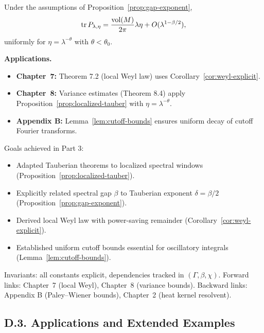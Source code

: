 \begin{corollary}\label{cor:weyl-explicit}
Under the assumptions of Proposition~\ref{prop:gap-exponent},
\[
\operatorname{tr} P_{\lambda,\eta} = \frac{\operatorname{vol}(M)}{2\pi}\lambda \eta + O(\lambda^{1-\beta/2}),
\]
uniformly for $\eta=\lambda^{-\theta}$ with $\theta<\theta_0$.  
\end{corollary}

\medskip

\noindent \textbf{Applications.}  
\begin{itemize}
  \item \textbf{Chapter~7:} Theorem 7.2 (local Weyl law) uses Corollary~\ref{cor:weyl-explicit}.  
  \item \textbf{Chapter~8:} Variance estimates (Theorem 8.4) apply Proposition~\ref{prop:localized-tauber} with $\eta=\lambda^{-\theta}$.  
  \item \textbf{Appendix B:} Lemma~\ref{lem:cutoff-bounds} ensures uniform decay of cutoff Fourier transforms.  
\end{itemize}

\medskip

\begin{auditblock}[D3]
Goals achieved in Part 3:
\begin{itemize}
  \item Adapted Tauberian theorems to localized spectral windows (Proposition~\ref{prop:localized-tauber}).  
  \item Explicitly related spectral gap $\beta$ to Tauberian exponent $\delta=\beta/2$ (Proposition~\ref{prop:gap-exponent}).  
  \item Derived local Weyl law with power-saving remainder (Corollary~\ref{cor:weyl-explicit}).  
  \item Established uniform cutoff bounds essential for oscillatory integrals (Lemma~\ref{lem:cutoff-bounds}).  
\end{itemize}
Invariants: all constants explicit, dependencies tracked in $(\Gamma,\beta,\chi)$.  
Forward links: Chapter~7 (local Weyl), Chapter~8 (variance bounds).  
Backward links: Appendix B (Paley–Wiener bounds), Chapter~2 (heat kernel resolvent).  
\end{auditblock}

\subsection*{D.3. Applications and Extended Examples}

